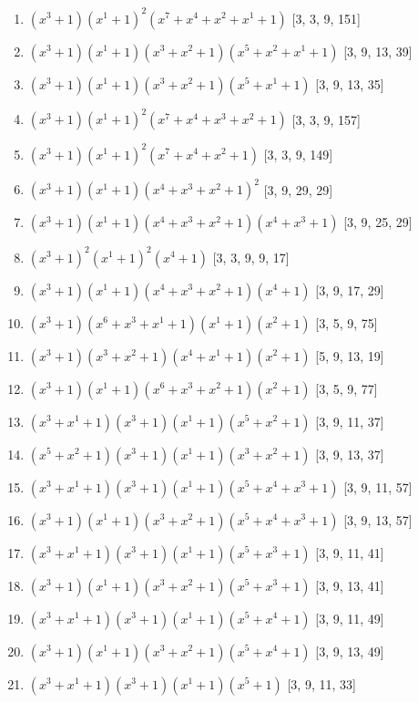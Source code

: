 \documentclass[10pt,twocolumn]{article}
\begin{document}
\begin{enumerate}
\item $(x^{3} + 1)(x^{1} + 1)^{2}(x^{7} + x^{4} + x^{2} + x^{1} + 1)$  [3, 3, 9, 151]
\item $(x^{3} + 1)(x^{1} + 1)(x^{3} + x^{2} + 1)(x^{5} + x^{2} + x^{1} + 1)$  [3, 9, 13, 39]
\item $(x^{3} + 1)(x^{1} + 1)(x^{3} + x^{2} + 1)(x^{5} + x^{1} + 1)$  [3, 9, 13, 35]
\item $(x^{3} + 1)(x^{1} + 1)^{2}(x^{7} + x^{4} + x^{3} + x^{2} + 1)$  [3, 3, 9, 157]
\item $(x^{3} + 1)(x^{1} + 1)^{2}(x^{7} + x^{4} + x^{2} + 1)$  [3, 3, 9, 149]
\item $(x^{3} + 1)(x^{1} + 1)(x^{4} + x^{3} + x^{2} + 1)^{2}$  [3, 9, 29, 29]
\item $(x^{3} + 1)(x^{1} + 1)(x^{4} + x^{3} + x^{2} + 1)(x^{4} + x^{3} + 1)$  [3, 9, 25, 29]
\item $(x^{3} + 1)^{2}(x^{1} + 1)^{2}(x^{4} + 1)$  [3, 3, 9, 9, 17]
\item $(x^{3} + 1)(x^{1} + 1)(x^{4} + x^{3} + x^{2} + 1)(x^{4} + 1)$  [3, 9, 17, 29]
\item $(x^{3} + 1)(x^{6} + x^{3} + x^{1} + 1)(x^{1} + 1)(x^{2} + 1)$  [3, 5, 9, 75]
\item $(x^{3} + 1)(x^{3} + x^{2} + 1)(x^{4} + x^{1} + 1)(x^{2} + 1)$  [5, 9, 13, 19]
\item $(x^{3} + 1)(x^{1} + 1)(x^{6} + x^{3} + x^{2} + 1)(x^{2} + 1)$  [3, 5, 9, 77]
\item $(x^{3} + x^{1} + 1)(x^{3} + 1)(x^{1} + 1)(x^{5} + x^{2} + 1)$  [3, 9, 11, 37]
\item $(x^{5} + x^{2} + 1)(x^{3} + 1)(x^{1} + 1)(x^{3} + x^{2} + 1)$  [3, 9, 13, 37]
\item $(x^{3} + x^{1} + 1)(x^{3} + 1)(x^{1} + 1)(x^{5} + x^{4} + x^{3} + 1)$  [3, 9, 11, 57]
\item $(x^{3} + 1)(x^{1} + 1)(x^{3} + x^{2} + 1)(x^{5} + x^{4} + x^{3} + 1)$  [3, 9, 13, 57]
\item $(x^{3} + x^{1} + 1)(x^{3} + 1)(x^{1} + 1)(x^{5} + x^{3} + 1)$  [3, 9, 11, 41]
\item $(x^{3} + 1)(x^{1} + 1)(x^{3} + x^{2} + 1)(x^{5} + x^{3} + 1)$  [3, 9, 13, 41]
\item $(x^{3} + x^{1} + 1)(x^{3} + 1)(x^{1} + 1)(x^{5} + x^{4} + 1)$  [3, 9, 11, 49]
\item $(x^{3} + 1)(x^{1} + 1)(x^{3} + x^{2} + 1)(x^{5} + x^{4} + 1)$  [3, 9, 13, 49]
\item $(x^{3} + x^{1} + 1)(x^{3} + 1)(x^{1} + 1)(x^{5} + 1)$  [3, 9, 11, 33]

\end{enumerate}
\end{document}
